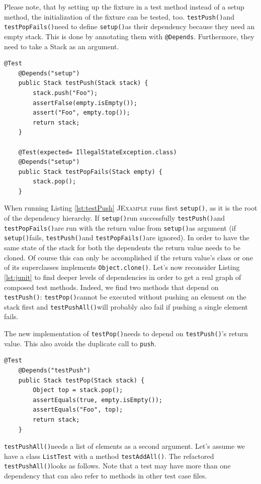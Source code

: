 \documentclass[11pt,a4paper,pdftex]{article}
\newcommand{\JExample}{\textsc{JExample}\xspace}
\newcommand{\ttt}[1]{\texttt{#1}}
\newcommand{\setup}{\ttt{setup()}}
\newcommand{\testPush}{\ttt{testPush()}}
\newcommand{\testPushAll}{\ttt{testPushAll()}}
\newcommand{\testPop}{\ttt{testPop()}}
\newcommand{\testPopFails}{\ttt{testPopFails()}}
\begin{document}
Please note, that by setting up the fixture in a test method instead of a setup method, the initialization of the fixture can be tested, too.
\testPush and \testPopFails need to define \setup as their dependency because they need an empty stack. This is done by annotating them with \ttt{@Depends}. Furthermore, they need to take a Stack as an argument.

\begin{lstlisting}[label=lst:testpush,caption=Take another test's result as input value.]
    @Test
    @Depends("setup")
    public Stack testPush(Stack stack) {
        stack.push("Foo");
        assertFalse(empty.isEmpty());
        assert("Foo", empty.top());
        return stack;
    }

    @Test(expected= IllegalStateException.class)
    @Depends("setup")
    public Stack testPopFails(Stack empty) {
        stack.pop();
    }
\end{lstlisting}

When running Listing \ref{lst:testPush} \JExample runs first \setup, as it is the root of the dependency hierarchy. If \setup run successfully \testPush and \testPopFails are run with the return value from \setup as argument (if \setup fails, \testPush and \testPopFails are ignored).
In order to have the same state of the stack for both the dependents the return value needs to be cloned. Of course this can only be accomplished if the return value's class or one of its superclasses implements \verb|Object.clone()|.
Let's now reconsider Listing \ref{lst:junit} to find deeper levels of dependencies in order to get a real graph of composed test methods.
Indeed, we find two methods that depend on \testPush: \testPop cannot be executed without pushing an element on the stack first and \testPushAll will probably also fail if pushing a single element fails.

The new implementation of \testPop needs to depend on \testPush's return value. This also avoids the duplicate call to \ttt{push}.

\begin{lstlisting}[label=lst:testpop,caption=Avoid code duplication using dependencies.]
    @Test
    @Depends("testPush")
    public Stack testPop(Stack stack) {
        Object top = stack.pop();
        assertEquals(true, empty.isEmpty());
        assertEquals("Foo", top);
        return stack;
    }
\end{lstlisting}

\testPushAll needs a list of elements as a second argument. Let's assume we have a class \ttt{ListTest} with a method \ttt{testAddAll()}. The refactored \testPushAll looks as follows. Note that a test may have more than one dependency that can also refer to methods in other test case files.
\end{document}
